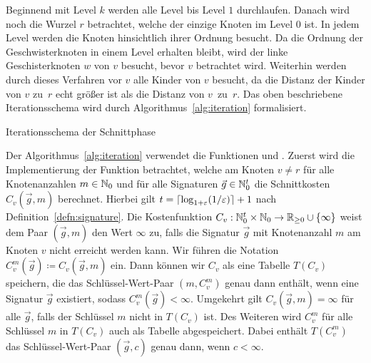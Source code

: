 Beginnend mit Level $k$ werden alle Level bis Level $1$ durchlaufen.
Danach wird noch die Wurzel $r$ betrachtet, welche der einzige Knoten im Level $0$ ist. 
In jedem Level werden die Knoten hinsichtlich ihrer Ordnung besucht.
Da die Ordnung der Geschwisterknoten in einem Level erhalten bleibt, wird der linke Geschisterknoten $w$ von $v$ besucht, bevor $v$ betrachtet wird.
Weiterhin werden durch dieses Verfahren vor $v$ alle Kinder von $v$ besucht, da die Distanz der Kinder von $v$ zu~$r$ echt größer ist als die Distanz von $v$~zu~$r$.
Das oben beschriebene Iterationsschema wird durch Algorithmus~\ref{alg:iteration} formalisiert.

\begin{algorithm}
    \caption{Iterationsschema der Schnittphase}\label{alg:iteration}
    \begin{algorithmic}[1]
         
             
                \State {}
            \EndFor
        \EndFor
         
            \State {}
        \EndFor
    \end{algorithmic}
\end{algorithm}

\newcommand{\canfun}{\textproc{cut\_at\_node}}
\newcommand{\carfun}{\textproc{cut\_at\_root}}

Der Algorithmus~\ref{alg:iteration} verwendet die Funktionen \canfun{} und \carfun{}.
Zuerst wird die Implementierung der Funktion \canfun{} betrachtet, welche am Knoten $v \neq r$ für alle Knotenanzahlen $m \in \mathbb{N}_0$ und für alle Signaturen $\vec{g} \in \mathbb{N}_0^t$ die Schnittkosten $C_v(\vec{g}, m)$ berechnet.
Hierbei gilt $t = \lceil\log_{1+\varepsilon}(1/\varepsilon)\rceil + 1$ nach Definition~\ref{defn:signature}.
Die Kostenfunktion $C_v : \mathbb{N}_0^t \times \mathbb{N}_0 \rightarrow \mathbb{R}_{\geq 0} \cup \{\infty\}$ weist dem Paar $(\vec{g}, m)$ den Wert $\infty$ zu, falls die Signatur $\vec{g}$ mit Knotenanzahl $m$ am Knoten $v$ nicht erreicht werden kann.
Wir führen die Notation $C^m_v(\vec{g}) \coloneqq C_v(\vec{g}, m)$ ein.
Dann können wir $C_v$ als eine Tabelle $T(C_v)$ speichern, die das Schlüssel-Wert-Paar $(m,C^m_v)$ genau dann enthält, wenn eine Signatur $\vec{g}$ existiert, sodass $C^m_v(\vec{g}) < \infty$.
Umgekehrt gilt $C_v(\vec{g}, m) = \infty$ für alle $\vec{g}$, falls der Schlüssel $m$ nicht in $T(C_v)$ ist.
Des Weiteren wird $C_v^m$ für alle Schlüssel $m$ in $T(C_v)$ auch als Tabelle abgespeichert.
Dabei enthält $T(C_v^m)$ das Schlüssel-Wert-Paar $(\vec{g}, c)$ genau dann, wenn $c < \infty$.

